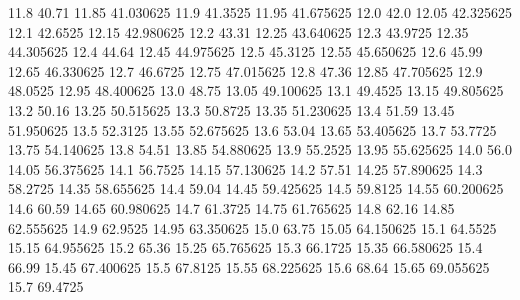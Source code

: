            11.8            40.71
          11.85        41.030625
           11.9          41.3525
          11.95        41.675625
           12.0             42.0
          12.05        42.325625
           12.1          42.6525
          12.15        42.980625
           12.2            43.31
          12.25        43.640625
           12.3          43.9725
          12.35        44.305625
           12.4            44.64
          12.45        44.975625
           12.5          45.3125
          12.55        45.650625
           12.6            45.99
          12.65        46.330625
           12.7          46.6725
          12.75        47.015625
           12.8            47.36
          12.85        47.705625
           12.9          48.0525
          12.95        48.400625
           13.0            48.75
          13.05        49.100625
           13.1          49.4525
          13.15        49.805625
           13.2            50.16
          13.25        50.515625
           13.3          50.8725
          13.35        51.230625
           13.4            51.59
          13.45        51.950625
           13.5          52.3125
          13.55        52.675625
           13.6            53.04
          13.65        53.405625
           13.7          53.7725
          13.75        54.140625
           13.8            54.51
          13.85        54.880625
           13.9          55.2525
          13.95        55.625625
           14.0             56.0
          14.05        56.375625
           14.1          56.7525
          14.15        57.130625
           14.2            57.51
          14.25        57.890625
           14.3          58.2725
          14.35        58.655625
           14.4            59.04
          14.45        59.425625
           14.5          59.8125
          14.55        60.200625
           14.6            60.59
          14.65        60.980625
           14.7          61.3725
          14.75        61.765625
           14.8            62.16
          14.85        62.555625
           14.9          62.9525
          14.95        63.350625
           15.0            63.75
          15.05        64.150625
           15.1          64.5525
          15.15        64.955625
           15.2            65.36
          15.25        65.765625
           15.3          66.1725
          15.35        66.580625
           15.4            66.99
          15.45        67.400625
           15.5          67.8125
          15.55        68.225625
           15.6            68.64
          15.65        69.055625
           15.7          69.4725
